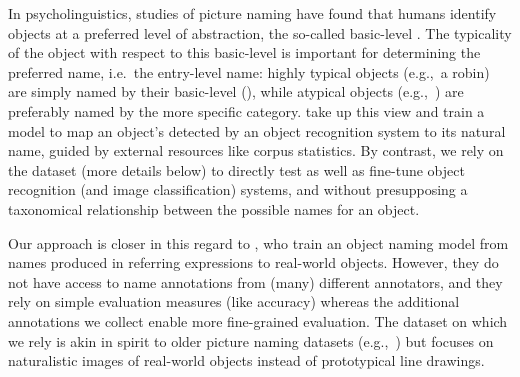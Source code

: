 
%
In psycholinguistics, studies of picture naming have found that humans identify objects at a preferred level of abstraction, the so-called basic-level \cite{rosch1976basic,jolicoeur1984pictures}. 
The typicality of the object with respect to this basic-level \category is important for determining the preferred name, i.e.\ the entry-level name: highly typical objects (e.g.,\ a robin) are simply named by their basic-level \category (), while atypical objects (e.g.,\ ) are preferably named by the more specific category.
 take up this view and train a model to map an object's \category detected by an object recognition system to its natural name, guided by external resources like corpus statistics.
By contrast, we rely on the \mn dataset (more details below) to directly test as well as fine-tune object recognition (and image classification) systems, and without presupposing a taxonomical relationship between the possible names for an object.

Our approach is closer in this regard to , who train an object naming model from names produced in referring expressions to real-world objects.
However, they do not have access to name annotations from (many) different annotators, and they rely on simple evaluation measures (like accuracy) whereas the additional annotations we collect enable more fine-grained evaluation.
The \mn dataset on which we rely is akin in spirit to older picture naming datasets (e.g.,~) but focuses on naturalistic images of real-world objects instead of prototypical line drawings.

